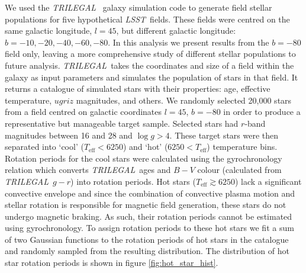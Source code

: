 \documentclass[useAMS, usenatbib, preprint, 12pt]{aastex}
\newcommand{\LSST}{{\it LSST}}
\newcommand{\TRILEGAL}{{\it TRILEGAL}}
\newcommand{\logg}{$\log g$}
\begin{document}
We used the \TRILEGAL\ \citep{Girardi2012} galaxy simulation code to generate
field stellar populations for five hypothetical \LSST\ fields.
These fields were centred on the same galactic longitude, $l=45$, but
different galactic longitude: $b=-10,-20,-40,-60,-80$.
In this analysis we present results from the $b=-80$ field only, leaving a
more comprehensive study of different stellar populations to future analysis.
\TRILEGAL\ takes the coordinates and size of a field within the galaxy as
input parameters and simulates the population of stars in that field.
It returns a catalogue of simulated stars with their properties: age,
effective temperature, $ugriz$ magnitudes, and others.
We randomly selected 20,000 stars from a field centred on galactic coordinates
$l=45$, $b=-80$ in order to produce a representative but manageable target
sample.
Selected stars had $r$-band magnitudes between 16 and 28 and \logg $>4$.
These target stars were then separated into `cool' ($T_{\mathrm{eff}}< 6250$)
and `hot' ($6250 < T_{\mathrm{eff}}$) temperature bins.
Rotation periods for the cool stars were calculated using the
\citet{Angus2015} gyrochronology relation which converts \TRILEGAL\ ages and
$B-V$ colour (calculated from \TRILEGAL\ $g-r$) into rotation periods.
Hot stars ($T_{\mathrm{eff}}\gtrsim 6250$) lack a significant convective
envelope and since the combination of convective plasma motion and stellar
rotation is responsible for magnetic field generation, these stars do not
undergo magnetic braking.
As such, their rotation periods cannot be estimated using gyrochronology.
To assign rotation periods to these hot stars we fit a sum of two Gaussian
functions to the rotation periods of hot stars in the \citet{Mcquillan2014}
catalogue and randomly sampled from the resulting distribution.
The distribution of hot star rotation periods is shown in figure
\ref{fig:hot_star_hist}.
\end{document}
